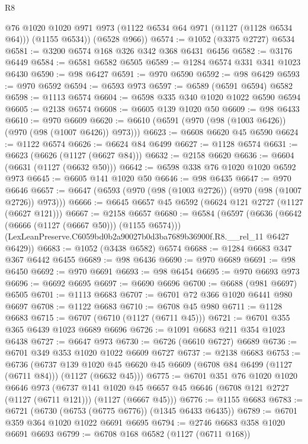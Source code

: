 \begin{lexlean}{R8}
\begin{coremodule}
        @76
        @1020
        @1020
        @971
        @973
        (@1122 @6534 @64 @971 (@1127 (@1128 @6534 @64)))
        (@1155 @6534))
      (@6528 @966))
@6574 := @1052 (@3375 @2727) @6534
@6581 := @3200 @6574 @168 @326 @342 @368 @6431 @6456
@6582 := @3176 @6449
@6584 := @6581 @6582 @6505
@6589 := @1284 @6574 @331 @341 @1023 @6430
@6590 := @98 @6427
@6591 := @970 @6590
@6592 := @98 @6429
@6593 := @970 @6592
@6594 := @6593 @973
@6597 := @6589 (@6591 @6594) @6582
@6598 := @1113 @6574
@6604 := @6598 @335 @340 @1020 @1022 @6590 @6594
@6605 := @2138 @6574
@6608 := @6605 @139 @1020 @50
@6609 := @98 @6433
@6610 := @970 @6609
@6620 := @6610 (@6591 (@970 (@98 (@1003 @6426)) (@970 (@98 (@1007 @6426)) @973)))
@6623 := @6608 @6620 @45 @6590
@6624 := @1122 @6574
@6626 := @6624 @84 @6499
@6627 := @1128 @6574
@6631 := @6623 (@6626 (@1127 (@6627 @84)))
@6632 := @2158 @6620
@6636 := @6604 (@6631 (@1127 (@6632 @50)))
@6642 := @6598 @338 @76 @1020 @1020 @6592 @973
@6645 := @6605 @141 @1020 @50
@6646 := @98 @6435
@6647 := @970 @6646
@6657 := @6647 (@6593 (@970 (@98 (@1003 @2726)) (@970 (@98 (@1007 @2726)) @973)))
@6666 := @6645 @6657 @45 @6592 (@6624 @121 @2727 (@1127 (@6627 @121)))
@6667 := @2158 @6657
@6680 := @6584
    (@6597
      (@6636 (@6642 (@6666 (@1127 (@6667 @50))) (@1155 @6574)))
      (LexLeanPreserve.C6059bd0b2a90027b0d3ba7689b36900f.R8.__rel_11 @6427 @6429))
@6683 := @1052 (@3438 @6582) @6574
@6688 := @1284 @6683 @347 @367 @6442 @6455
@6689 := @98 @6436
@6690 := @970 @6689
@6691 := @98 @6450
@6692 := @970 @6691
@6693 := @98 @6454
@6695 := @970 @6693 @973
@6696 := @6692 @6695
@6697 := @6690 @6696
@6700 := @6688 (@981 @6697) @6505
@6701 := @1113 @6683
@6707 := @6701 @72 @366 @1020 @6441 @980 @6697
@6708 := @1122 @6683
@6710 := @6708 @45 @980
@6711 := @1128 @6683
@6715 := @6707 (@6710 (@1127 (@6711 @45)))
@6721 := @6701 @355 @365 @6439 @1023 @6689 @6696
@6726 := @1091 @6683 @211 @354 @1023 @6438
@6727 := @6647 @973
@6730 := @6726 (@6610 @6727) @6689
@6736 := @6701 @349 @353 @1020 @1022 @6609 @6727
@6737 := @2138 @6683
@6753 := @6736
    (@6737 @139 @1020 @45 @6620 @45 @6609 (@6708 @84 @6499 (@1127 (@6711 @84))) (@1127 (@6632 @45)))
@6775 := @6701
    @351
    @76
    @1020
    @1020
    @6646
    @973
    (@6737
      @141
      @1020
      @45
      @6657
      @45
      @6646
      (@6708 @121 @2727 (@1127 (@6711 @121)))
      (@1127 (@6667 @45)))
@6776 := @1155 @6683
@6783 := @6721 (@6730 (@6753 (@6775 @6776)) (@1345 @6433 @6435))
@6789 := @6701 @359 @364 @1020 @1022 @6691 @6695
@6794 := @2746 @6683 @358 @1020 @6691 @6693
@6799 := @6708 @168 @6582 (@1127 (@6711 @168))

\end{coremodule}
\end{lexlean}
